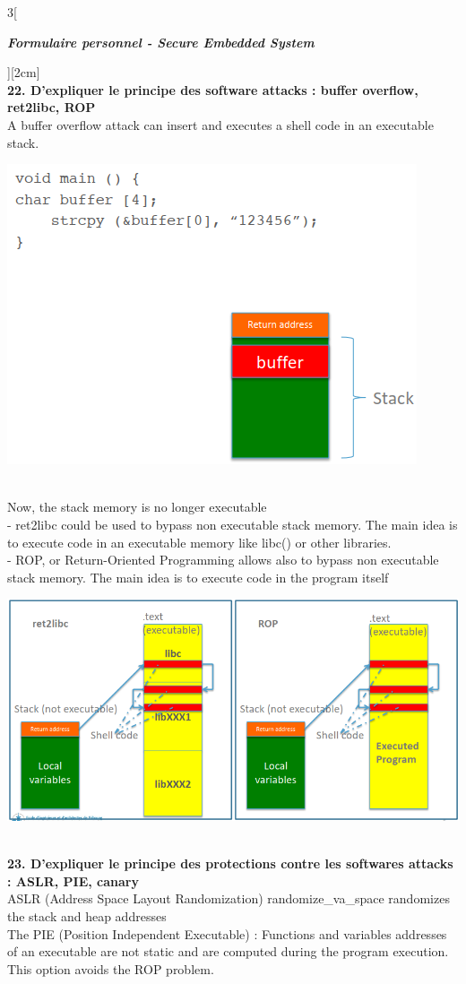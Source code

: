 \begin{multicols}{3}[\centerline{ \large\em \textbf{Formulaire personnel - Secure Embedded System}}][2cm]
\\ \textbf{22. D’expliquer le principe des software attacks : buffer overflow, ret2libc, ROP\\}
A buffer overflow attack can insert and executes a shell code in an executable
stack.\\
\begin{minipage}{\linewidth}
	\centering
    \includegraphics[width =0.4\columnwidth]{images/8.png}
\end{minipage}\\
Now, the stack memory is no longer executable\\
- ret2libc could be used to bypass non executable stack memory. The main idea is to execute code in an executable memory like libc() or other libraries.\\
- ROP, or Return-Oriented Programming allows also to bypass non executable stack memory. The main idea is to execute code in the program itself\\
\begin{minipage}{\linewidth}
	\centering
    \includegraphics[width =0.6\columnwidth]{images/7.png}
\end{minipage}
\\ \textbf{23. D’expliquer le principe des protections contre les softwares attacks : ASLR, PIE, canary\\}
ASLR (Address Space Layout Randomization) randomize\_va\_space randomizes
the stack and heap addresses\\
The PIE (Position Independent Executable) : Functions and variables addresses of an executable are not static and are computed during the program execution. This option avoids the ROP problem.\\

\end{multicols}

